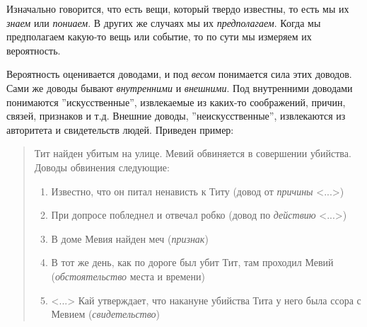 \documentclass[12pt]{article}
\begin{document}
Изначально говорится, что есть вещи, который твердо известны, то есть мы их \textit{знаем} или \textit{пониаем}. 
В других же случаях мы их \textit{предполагаем}.
Когда мы предполагаем какую-то вещь или событие, то по сути мы измеряем их вероятность. 

Вероятность оценивается доводами, и под \textit{весом} понимается сила этих доводов.
Сами же доводы бывают \textit{внутренними} и \textit{внешними}.
Под внутренними доводами понимаются ''искусственные'', извлекаемые из каких-то соображений, причин, связей, признаков и т.д. 
Внешние доводы, ''неискусственные'', извлекаются из авторитета и свидетельств людей.
Приведен пример:
\begin{quote}
Тит найден убитым на улице.
Мевий обвиняется в совершении убийства.
Доводы обвинения следующие:
	\begin{enumerate}
	\item Известно, что он питал ненависть к Титу (довод от \textit{причины} <...>)
	\item При допросе побледнел и отвечал робко (довод по \textit{действию} <...>)
	\item В доме Мевия найден меч (\textit{признак})
	\item В тот же день, как по дороге был убит Тит, там проходил Мевий  (\textit{обстоятельство} места и времени)
	\item <...> Кай утверждает, что накануне убийства Тита у него была ссора с Мевием (\textit{свидетельство})
	\end{enumerate}
\end{quote}
\end{document}
